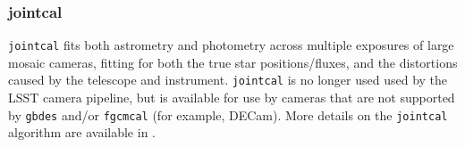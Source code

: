 \subsubsection{jointcal}
\label{sec:jointcal}

\texttt{jointcal} fits both astrometry and photometry across multiple exposures of large mosaic cameras, fitting for both the true star positions/fluxes, and the distortions caused by the telescope and instrument.
\texttt{jointcal} is no longer used used by the LSST camera pipeline, but is available for use by cameras that are not supported by \texttt{gbdes} and/or \texttt{fgcmcal} (for example, DECam).
More details on the \texttt{jointcal} algorithm are available in \citet{DMTN-036}.
